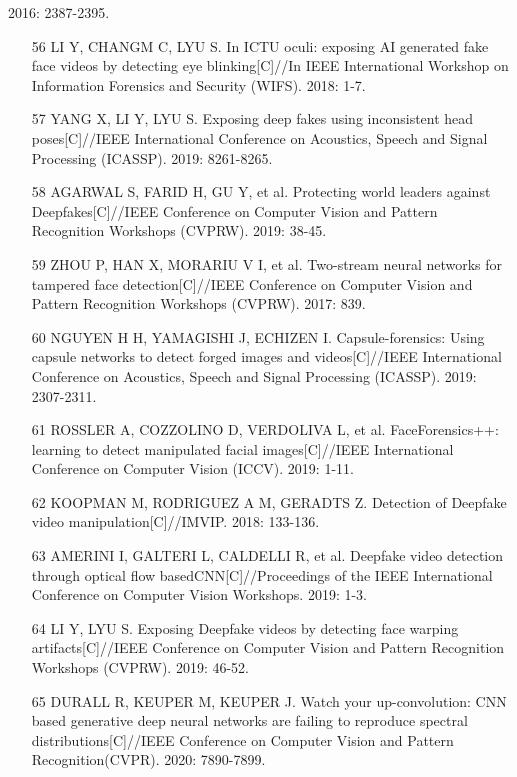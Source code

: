 \documentclass{article}
\begin{document}
2016: 2387-2395.
\begin{itemize}
\item 
[56] LI Y, CHANGM C, LYU S. In ICTU oculi: exposing AI generated fake face videos by detecting eye blinking[C]//In IEEE International Workshop on Information Forensics and Security (WIFS). 2018: 1-7.

\item 
[57] YANG X, LI Y, LYU S. Exposing deep fakes using inconsistent head poses[C]//IEEE International Conference on Acoustics, Speech and Signal Processing (ICASSP). 2019: 8261-8265.

\item 
[58] AGARWAL S, FARID H, GU Y, et al. Protecting world leaders against Deepfakes[C]//IEEE Conference on Computer Vision and Pattern Recognition Workshops (CVPRW). 2019: 38-45.

\item 
[59] ZHOU P, HAN X, MORARIU V I, et al. Two-stream neural networks for tampered face detection[C]//IEEE Conference on Computer Vision and Pattern Recognition Workshops (CVPRW). 2017: 839.

\item 
[60] NGUYEN H H, YAMAGISHI J, ECHIZEN I. Capsule-forensics: Using capsule networks to detect forged images and videos[C]//IEEE International Conference on Acoustics, Speech and Signal Processing (ICASSP). 2019: 2307-2311.

\item 
[61] ROSSLER A, COZZOLINO D, VERDOLIVA L, et al. FaceForensics++: learning to detect manipulated facial images[C]//IEEE International Conference on Computer Vision (ICCV). 2019: 1-11.

\item 
[62] KOOPMAN M, RODRIGUEZ A M, GERADTS Z. Detection of Deepfake video manipulation[C]//IMVIP. 2018: 133-136.

\item 
[63] AMERINI I, GALTERI L, CALDELLI R, et al. Deepfake video detection through optical flow basedCNN[C]//Proceedings of the IEEE International Conference on Computer Vision Workshops. 2019: 1-3.

\item 
[64] LI Y, LYU S. Exposing Deepfake videos by detecting face warping artifacts[C]//IEEE Conference on Computer Vision and Pattern Recognition Workshops (CVPRW). 2019: 46-52.

\item 
[65] DURALL R, KEUPER M, KEUPER J. Watch your up-convolution: CNN based generative deep neural networks are failing to reproduce spectral distributions[C]//IEEE Conference on Computer Vision and Pattern Recognition(CVPR). 2020: 7890-7899.


\end{itemize}
\end{document}
